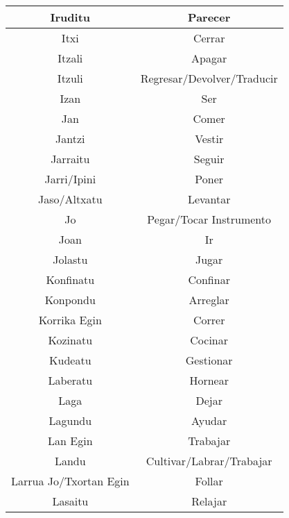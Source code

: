 \documentclass[11pt, a4paper]{article}
\begin{document}
\begin{longtable}{cc}
\hline
Iruditu                    & Parecer                     \\ 
\hline
Itxi                       & Cerrar                      \\ 
\hline
Itzali                     & Apagar                      \\ 
\hline
Itzuli                     & Regresar/Devolver/Traducir  \\ 
\hline
Izan                       & Ser                         \\ 
\hline
Jan                        & Comer                       \\ 
\hline
Jantzi                     & Vestir                      \\ 
\hline
Jarraitu                   & Seguir                      \\ 
\hline
Jarri/Ipini                & Poner                       \\ 
\hline
Jaso/Altxatu               & Levantar                    \\ 
\hline
Jo                         & Pegar/Tocar Instrumento     \\ 
\hline
Joan                       & Ir                          \\ 
\hline
Jolastu                    & Jugar                       \\ 
\hline
Konfinatu                  & Confinar                    \\ 
\hline
Konpondu                   & Arreglar                    \\ 
\hline
Korrika Egin               & Correr                      \\ 
\hline
Kozinatu                   & Cocinar                     \\ 
\hline
Kudeatu                    & Gestionar                   \\ 
\hline
Laberatu                   & Hornear                     \\ 
\hline
Laga                       & Dejar                       \\ 
\hline
Lagundu                    & Ayudar                      \\ 
\hline
Lan Egin                   & Trabajar                    \\ 
\hline
Landu                      & Cultivar/Labrar/Trabajar    \\ 
\hline
Larrua Jo/Txortan Egin     & Follar                      \\ 
\hline
Lasaitu                    & Relajar                     \\ 

\end{longtable}
\end{document}
